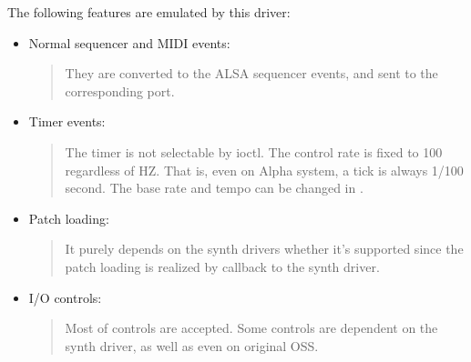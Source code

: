\documentclass[a4paper,8pt,english]{sphinxmanual}
\begin{document}
The following features are emulated by this driver:
\begin{itemize}
\item {} 
Normal sequencer and MIDI events:
\begin{quote}

They are converted to the ALSA sequencer events, and sent to the
corresponding port.
\end{quote}

\item {} 
Timer events:
\begin{quote}

The timer is not selectable by ioctl. The control rate is fixed to
100 regardless of HZ. That is, even on Alpha system, a tick is always
1/100 second. The base rate and tempo can be changed in .
\end{quote}

\item {} 
Patch loading:
\begin{quote}

It purely depends on the synth drivers whether it's supported since
the patch loading is realized by callback to the synth driver.
\end{quote}

\item {} 
I/O controls:
\begin{quote}

Most of controls are accepted. Some controls
are dependent on the synth driver, as well as even on original OSS.
\end{quote}

\end{itemize}
\end{document}

